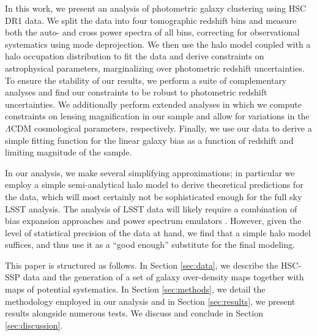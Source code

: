 \documentclass[a4paper,11pt]{article}
\begin{document}
In this work, we present an analysis of photometric galaxy clustering using HSC DR1 data. We split the data into four tomographic redshift bins and measure both the auto- and cross power spectra of all bins, correcting for observational systematics using mode deprojection. We then use the halo model coupled with a halo occupation distribution to fit the data and derive constraints on astrophysical parameters, marginalizing over photometric redshift uncertainties. To ensure the stability of our results, we perform a suite of complementary analyses and find our constraints to be robust to photometric redshift uncertainties. We additionally perform extended analyses in which we compute constraints on lensing magnification in our sample and allow for variations in the $\Lambda$CDM cosmological parameters, respectively. Finally, we use our data to derive a simple fitting function for the linear galaxy bias as a function of redshift and limiting magnitude of the sample.

In our analysis, we make several simplifying approximations; in particular we employ a simple semi-analytical halo model to derive theoretical predictions for the data, which will most certainly not be sophisticated enough for the full sky LSST analysis. The analysis of LSST data will likely require  a combination of  bias expansion approaches \cite{0902.0991,1402.5916,1611.09787,1910.07097} and power spectrum emulators \cite{1804.05865,1705.03388}. However, given the level of statistical precision of the data at hand, we find that a simple halo model suffices, and thus use it as a ``good enough'' substitute for the final modeling.

This paper is structured as follows. In Section \ref{sec:data}, we describe the HSC-SSP data and the generation of a set of galaxy over-density maps together with maps of potential systematics. In Section \ref{sec:methods}, we detail the methodology employed in our analysis and in Section \ref{sec:results}, we present results alongside numerous tests. We discuss and conclude in Section \ref{sec:discussion}.
\end{document}

